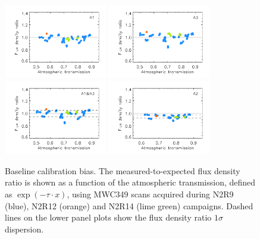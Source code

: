 \begin{figure}[ht!]
  \begin{center}
    \includegraphics[clip=true, trim={0.9cm, 0, 0, 0.6cm},width=0.4\textwidth]{Figures/Calibration/plot_flux_density_ratio_MWC349_obstau_corrected_skydip_narrow_a1.pdf}
    \includegraphics[clip=true, trim={0.9cm, 0, 0, 0.6cm},width=0.4\textwidth]{Figures/Calibration/plot_flux_density_ratio_MWC349_obstau_corrected_skydip_narrow_a3.pdf}
    \includegraphics[clip=true, trim={0.9cm, 0, 0, 0.6cm},width=0.4\textwidth]{Figures/Calibration/plot_flux_density_ratio_MWC349_obstau_corrected_skydip_narrow_1mm.pdf}
    \includegraphics[clip=true, trim={0.9cm, 0, 0, 0.6cm},width=0.4\textwidth]{Figures/Calibration/plot_flux_density_ratio_MWC349_obstau_corrected_skydip_narrow_a2.pdf}
    \caption[Baseline calibration bias]{Baseline calibration
      bias. The measured-to-expected flux density ratio is shown as a
      function of the atmospheric transmission, defined as $\exp
      \left( - \tau \cdot x \right)$, using MWC349 scans acquired during N2R9 (blue),
      N2R12 (orange) and N2R14 (lime green) campaigns. Dashed lines on
      the lower panel plots
      show the flux density ratio $1 \sigma $ dispersion.}
    \label{fig:mwc349_obstau_corrected_skydip}
  \end{center}
\end{figure}

